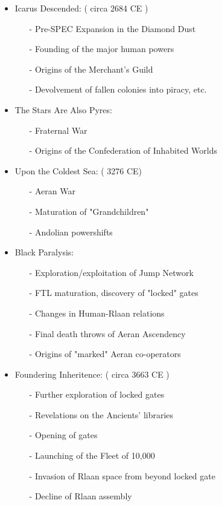 \begin{itemize}
\item	Icarus Descended: ( circa 2684 CE )
\begin{itemize}
\item	[-] Pre-SPEC Expansion in the Diamond Dust
\item	[-] Founding of the major human powers
\item	[-] Origins of the Merchant's Guild
\item	[-] Devolvement of fallen colonies into piracy, etc.
\end{itemize}
\item	The Stars Are Also Pyres:
\begin{itemize}
\item	[-] Fraternal War
\item	[-] Origins of the Confederation of Inhabited Worlds
\end{itemize}
\item	Upon the Coldest Sea: ( 3276 CE)
\begin{itemize}
\item	[-] Aeran War
\item	[-] Maturation of "Grandchildren"
\item	[-] Andolian powershifts
\end{itemize}
\item	Black Paralysis:
\begin{itemize}
\item	[-] Exploration/exploitation of Jump Network
\item	[-] FTL maturation, discovery of "locked" gates
\item	[-] Changes in Human-Rlaan relations
\item	[-] Final death throws of Aeran Ascendency
\item	[-] Origins of "marked" Aeran co-operators
\end{itemize}
\item	Foundering Inheritence: ( circa 3663 CE )
\begin{itemize}
\item	[-] Further exploration of locked gates
\item	[-] Revelations on the Ancients' libraries
\item	[-] Opening of gates
\item	[-] Launching of the Fleet of 10,000
\item	[-] Invasion of Rlaan space from beyond locked gate	
\item	[-] Decline of Rlaan assembly

\end{itemize}
\end{itemize}
